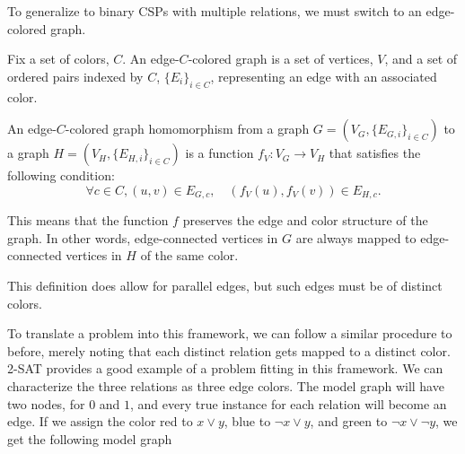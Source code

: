 To generalize to binary CSPs with multiple relations, we must switch to an edge-colored graph. 

\begin{definition}
Fix a set of colors, $C$. An edge-$C$-colored graph is a set of vertices, $V$, and a set of ordered pairs indexed by $C$, $\{E_i\}_{i\in C}$, representing an edge with an associated color. 
\end{definition}

\begin{definition}
An edge-$C$-colored graph homomorphism from a graph $G = (V_G, \{E_{G,i}\}_{i\in C})$ to a graph $H = (V_H, \{E_{H, i}\}_{i\in C})$ is a function $f_V: V_G \rightarrow V_H$ that satisfies the following condition:
\begin{equation}
    \forall c \in C, (u, v) \in E_{G, c}, \quad (f_V(u), f_V(v)) \in E_{H, c}.    
\end{equation}    
\end{definition}

This means that the function $f$ preserves the edge and color structure of the graph. In other words, edge-connected vertices in $G$ are always mapped to edge-connected vertices in $H$ of the same color.

This definition does allow for parallel edges, but such edges must be of distinct colors.

To translate a problem into this framework, we can follow a similar procedure to before, merely noting that each distinct relation gets mapped to a distinct color. 2-SAT provides a good example of a problem fitting in this framework. We can characterize the three relations as three edge colors. The model graph will have two nodes, for $0$ and $1$, and every true instance for each relation will become an edge. If we assign the color red to $x \vee y$, blue to $\neg x \vee y$, and green to $\neg x \vee \neg y$, we get the following model graph

\begin{center}
\end{center}

